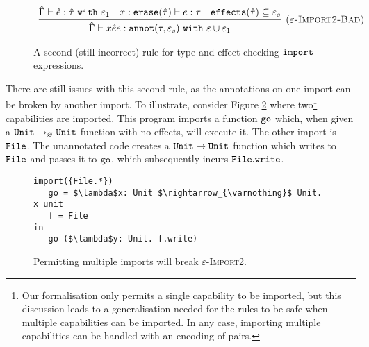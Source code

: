 \begin{figure}

\[
\begin{array}{c}

\infer[\textsc{($\varepsilon$-Import2-Bad)}]
	{ \hat \Gamma \vdash {x}{\hat e}{e}: \kwa{annot}(\tau, \varepsilon_s)~\kw{with} \varepsilon \cup \varepsilon_1 }
	{ \hat \Gamma \vdash \hat e: \hat \tau~\kw{with} \varepsilon_1 & x: \kwa{erase}(\hat \tau) \vdash e: \tau & \kwa{effects}(\hat \tau) \subseteq \varepsilon_s}

\end{array}
\]
\vspace{-0.3cm}
\caption{A second (still incorrect) rule for type-and-effect checking $\mathtt{import}$ expressions.}
\vspace{-0.5cm}
\label{fig:import_rule_2}
\end{figure}

There are still issues with this second rule, as the annotations on one import
can be broken by another import. To illustrate, consider Figure
\ref{fig:rule_import2_counterexample}
where two\footnote{Our formalisation only permits a single capability
  to be imported, but this discussion leads to a generalisation needed
  for the rules to be safe when multiple capabilities can be imported.
  In any case, importing multiple capabilities can be handled with an
  encoding of pairs.} capabilities are imported. This program imports
a function $\mathtt{go}$ which, when given a
$\mathtt{Unit} \rightarrow_{\varnothing} \mathtt{Unit}$ function with no effects, will
execute it. The other import is $\mathtt{File}$. The unannotated code
creates a $\mathtt{Unit} \rightarrow \mathtt{Unit}$ function which writes to
$\mathtt{File}$ and passes it to $\mathtt{go}$, which subsequently incurs
$\mathtt{File.write}$.

\begin{figure}[h]
\vspace{-0.5cm}

\begin{lstlisting}
import({File.*})
   go = $\lambda$x: Unit $\rightarrow_{\varnothing}$ Unit. x unit
   f = File
in
   go ($\lambda$y: Unit. f.write)
\end{lstlisting}

\vspace{-0.5cm}
\caption{Permitting multiple imports will break \textsc{$\varepsilon$-Import2}.}
\vspace{-0.5cm}
\label{fig:rule_import2_counterexample}
\end{figure}

